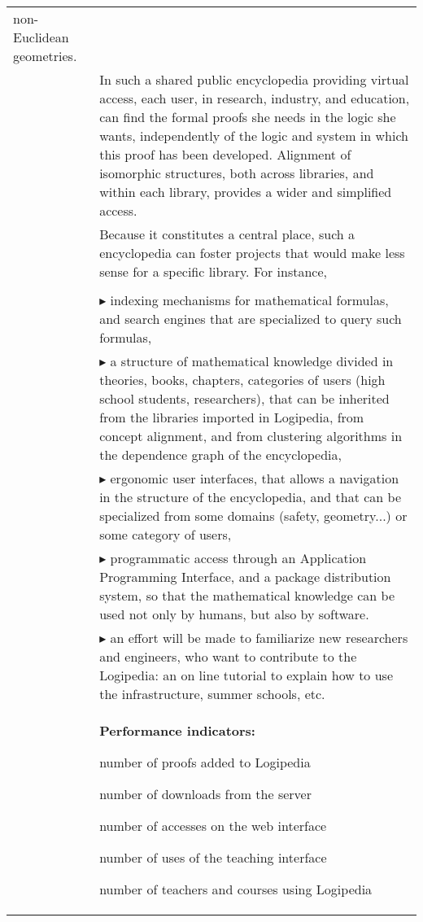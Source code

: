 \begin{longtable}{|p{}|p{}|}
non-Euclidean geometries.\\
&
\hspace{0.4cm}
In such a shared public encyclopedia providing virtual access, each
user, in research, industry, and education, can find the formal proofs
she needs in the logic she wants, independently of the logic and system in
which this
proof has been developed.  Alignment of isomorphic structures, both
across libraries, and
within each library, provides a wider and simplified access.\\
&
\hspace{0.4cm}
Because it constitutes a central place, such a encyclopedia can foster
projects that would make less sense for a specific library. For instance,\\
\\
&
$\blacktriangleright$
indexing mechanisms for mathematical formulas, and search engines
  that are specialized to query such formulas,
\\
&
$\blacktriangleright$
a structure of mathematical knowledge divided in theories, books,
    chapters, categories of users (high school students, researchers),
    that can be inherited from the libraries imported in
      Logipedia, from concept alignment, and from clustering
    algorithms in the dependence graph of the encyclopedia,
\\
&
$\blacktriangleright$
  ergonomic user interfaces, that allows a navigation in the
    structure of the encyclopedia, and that can be specialized from
    some domains (safety, geometry...) or some category of users,
\\
&
$\blacktriangleright$ programmatic access through an Application Programming
    Interface, and a package distribution system, so that the
    mathematical knowledge can be used not only by humans, but also by
    software.
\\
&
$\blacktriangleright$
an effort will be made to familiarize new researchers and engineers,
who want to contribute to the Logipedia:
an on line tutorial to explain how to use the infrastructure,
summer schools, etc.
\\
&
\colorbox{color3}{\bf Performance indicators:}
\begin{compactitem}
\item number of proofs added to Logipedia
\item number of downloads from the server
\item number of accesses on the web interface
\item number of uses of the teaching interface
\item number of teachers and courses using Logipedia
\end{compactitem}


\end{longtable}
